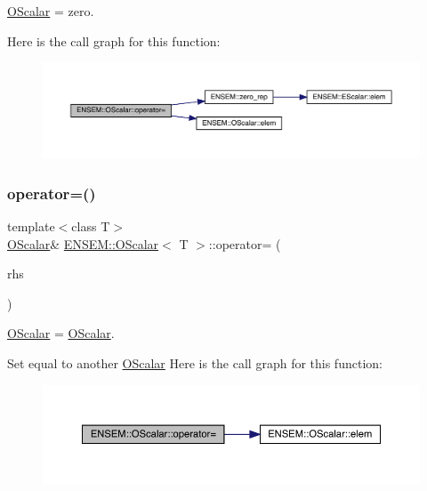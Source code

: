 \mbox{\hyperlink{classENSEM_1_1OScalar}{O\+Scalar}} = zero. 

Here is the call graph for this function\+:
\nopagebreak
\begin{figure}[H]
\begin{center}
\leavevmode
\includegraphics[width=350pt]{da/d80/classENSEM_1_1OScalar_a4fdfed29e219b358e05588826e672932_cgraph}
\end{center}
\end{figure}
\mbox{\label{classENSEM_1_1OScalar_a7c36649387edf21f3fa19f9ae63d4aca}} 
\subsubsection{\texorpdfstring{operator=()}{operator=()}\hspace{0.1cm}{\footnotesize\ttfamily [7/12]}}
{\footnotesize\ttfamily template$<$class T$>$ \\
\mbox{\hyperlink{classENSEM_1_1OScalar}{O\+Scalar}}\& \mbox{\hyperlink{classENSEM_1_1OScalar}{E\+N\+S\+E\+M\+::\+O\+Scalar}}$<$ T $>$\+::operator= (\begin{DoxyParamCaption}\item[{const \mbox{\hyperlink{classENSEM_1_1OScalar}{O\+Scalar}}$<$ T $>$ \&}]{rhs }\end{DoxyParamCaption})\hspace{0.3cm}{\ttfamily [inline]}}



\mbox{\hyperlink{classENSEM_1_1OScalar}{O\+Scalar}} = \mbox{\hyperlink{classENSEM_1_1OScalar}{O\+Scalar}}. 

Set equal to another \mbox{\hyperlink{classENSEM_1_1OScalar}{O\+Scalar}} Here is the call graph for this function\+:
\nopagebreak
\begin{figure}[H]
\begin{center}
\leavevmode
\includegraphics[width=350pt]{da/d80/classENSEM_1_1OScalar_a7c36649387edf21f3fa19f9ae63d4aca_cgraph}
\end{center}
\end{figure}
\mbox{\label{classENSEM_1_1OScalar_a7c36649387edf21f3fa19f9ae63d4aca}} 
